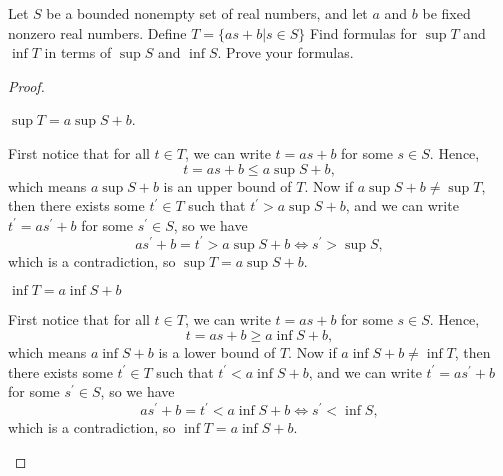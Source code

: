 
\begin{problem}[10 pts]  
Let $S$ be a bounded nonempty set of real numbers, and let $a$ and $b$
be fixed  nonzero real numbers. Define $T=\{as+b| s\in S\}$ Find formulas
for
$\sup T$ and $\inf T$ in terms of $\sup S$ and $\inf S$. Prove your
formulas.
\end{problem}
\begin{proof}
\begin{claim}
  \(\sup T = a \sup S + b\). 
\end{claim}
\begin{explanation}
First notice that for all \(t \in T\), we can write \(t = as + b\) for some \(s \in S\). Hence, 
\[
  t = a s + b \le  a \sup S + b,
\]   
which means \(a \sup S + b\) is an upper bound of \(T\). Now if \(a \sup S + b \neq \sup T\), then there exists some \(t^{\prime} \in T\) such that \(t^{\prime} > a \sup S + b\), and we can write \(t^{\prime} = as^{\prime} +b\) for some \(s^{\prime} \in S\), so we have 
\[
  a s^{\prime} + b = t^{\prime} > a \sup S + b \iff s^{\prime}  > \sup S,
\] which is a contradiction, so \(\sup T = a \sup S + b\).        
\end{explanation}
\begin{claim}
  \(\inf T = a \inf S + b\) 
\end{claim}
\begin{explanation}
First notice that for all \(t \in T\), we can write \(t = as + b\) for some \(s \in S\). Hence, 
\[
  t = a s + b \ge  a \inf S + b,
\]   
which means \(a \inf S + b\) is a lower bound of \(T\). Now if \(a \inf S + b \neq \inf T\), then there exists some \(t^{\prime} \in T\) such that \(t^{\prime} < a \inf S + b\), and we can write \(t^{\prime} = as^{\prime} +b\) for some \(s^{\prime} \in S\), so we have 
\[
  a s^{\prime} + b = t^{\prime} < a \inf S + b \iff s^{\prime}  < \inf S,
\] which is a contradiction, so \(\inf T = a \inf S + b\).   
\end{explanation}
\end{proof}